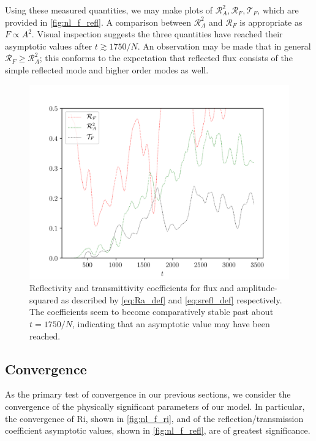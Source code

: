 \documentclass[
        fleqn,
        usenatbib,
    ]{mnras}
\begin{document}
Using these measured quantities, we may make plots of $\mathcal{R}_A^2,
\mathcal{R}_F, \mathcal{T}_F$, which are provided in \autoref{fig:nl_f_refl}. A
comparison between $\mathcal{R}_A^2$ and $\mathcal{R}_F$ is appropriate as $F
\propto A^2$. Visual inspection suggests the three quantities have reached
their asymptotic values after $t \gtrsim 1750/N$. An observation may be made
that in general $\mathcal{R}_F \geq \mathcal{R}_A^2$; this conforms to the
expectation that reflected flux consists of the simple reflected mode and higher
order modes as well.

\begin{figure}
    \centering
    \includegraphics[width=\columnwidth]{plots/nl_f_refl.png}
    \caption{Reflectivity and transmittivity coefficients for flux and
    amplitude-squared as described by \autoref{eq:Ra_def} and
    \autoref{eq:srefl_def} respectively. The coefficients seem to become
    comparatively stable past about $t = 1750/N$, indicating that an asymptotic
    value may have been reached.}\label{fig:nl_f_refl}
\end{figure}

\subsection{Convergence}\label{ss:convergence}

As the primary test of convergence in our previous sections, we consider the
convergence of the physically significant parameters of our model. In
particular, the convergence of $\mathrm{Ri}$, shown in \autoref{fig:nl_f_ri},
and of the reflection/transmission coefficient asymptotic values, shown in
\autoref{fig:nl_f_refl}, are of greatest significance.
\end{document}
